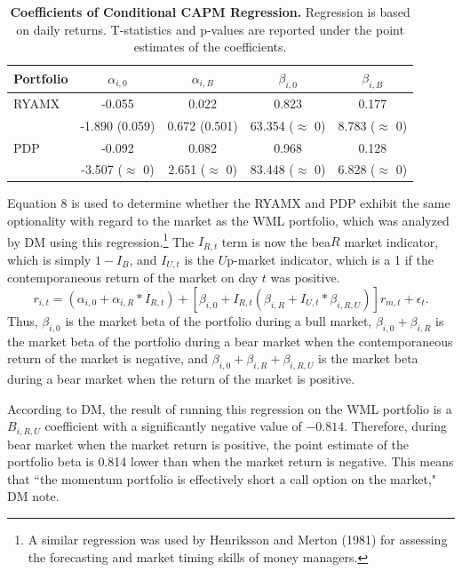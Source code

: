 \documentclass[12pt]{article}
\begin{document}
\begin{table}[h]
\centering
\caption{\textbf{Coefficients of Conditional CAPM Regression.} \footnotesize{Regression is based on daily returns. T-statistics and p-values are reported under the point estimates of the coefficients.}}
\begin{tabular}{l | c | c | c | c }
\hline
Portfolio & $\alpha_{i,0}$ & $\alpha_{i,B}$ & $\beta_{i, 0}$ & $\beta_{i, B}$\\
\hline
RYAMX & -0.055 & 0.022 & 0.823 & 0.177 \\
 & -1.890 (0.059) & 0.672 (0.501) & 63.354 ($\approx$ 0) & 8.783 ($\approx$ 0)\\
\hline
PDP & -0.092 & 0.082 & 0.968 & 0.128\\
 & -3.507 ($\approx$ 0) & 2.651 ($\approx$ 0) & 83.448 ($\approx$ 0) & 6.828 ($\approx$ 0)\\
\end{tabular}
\end{table}

Equation 8 is used to determine whether the RYAMX and PDP exhibit the same optionality with regard to the market as the WML portfolio, which was analyzed by DM using this regression.\footnote{A similar regression was used by Henriksson and Merton (1981) for assessing the forecasting and market timing skills of money managers.} The $I_{R,t}$ term is now the bea$R$ market indicator, which is simply $1-I_{B}$, and $I_{U,t}$ is the $U$p-market indicator, which is a 1 if the contemporaneous return of the market on day $t$ was positive.
\begin{equation}
r_{i,t}=(\alpha_{i,0}+\alpha_{i,R}*I_{R,t})+[\beta_{i,0}+I_{R,t}(\beta_{i,R}+I_{U,t}*\beta_{i,R,U})]r_{m,t}+\epsilon_{t}.
\end{equation}
Thus, $\beta_{i,0}$ is the market beta of the portfolio during a bull market, $\beta_{i,0}+\beta_{i,R}$ is the market beta of the portfolio during a bear market when the contemporaneous return of the market is negative, and $\beta_{i,0}+\beta_{i,R}+\beta_{i,R,U}$ is the market beta during a bear market when the return of the market is positive. 

According to DM, the result of running this regression on the WML portfolio is a $B_{i,R,U}$ coefficient with a significantly negative value of $-0.814.$ Therefore, during bear market when the market return is positive, the point estimate of the portfolio beta is 0.814 lower than when the market return is negative. This means that ``the momentum portfolio is effectively short a call option on the market," DM note.
\end{document}
